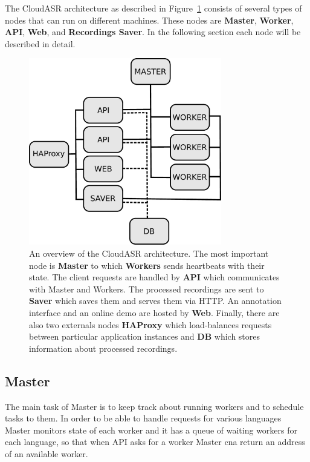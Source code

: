 The CloudASR architecture as described in Figure~\ref{fig:architecture} consists of several types of nodes that can run on different machines.
These nodes are \textbf{Master}, \textbf{Worker}, \textbf{API}, \textbf{Web},  and \textbf{Recordings Saver}.
In the following section each node will be described in detail.


\begin{figure}[h]
  \centering
  \includegraphics[width=0.75\textwidth]{./img/architecture.pdf}

  \caption{
    An overview of the CloudASR architecture.
    The most important node is \textbf{Master} to which \textbf{Workers} sends heartbeats with their state.
    The client requests are handled by \textbf{API} which communicates with Master and Workers.
    The processed recordings are sent to \textbf{Saver} which saves them and serves them via HTTP.
    An annotation interface and an online demo are hosted by \textbf{Web}.
    Finally, there are also two externals nodes \textbf{HAProxy}
      which load-balances requests between particular application instances
      and \textbf{DB} which stores information about processed recordings.
  }
  \label{fig:architecture}
\end{figure}


\subsection{Master}
The main task of Master is to keep track about running workers and to schedule tasks to them.
In order to be able to handle requests for various languages
  Master monitors state of each worker
  and it has a queue of waiting workers for each language,
    so that when API asks for a worker Master cna return an address of an available worker.

